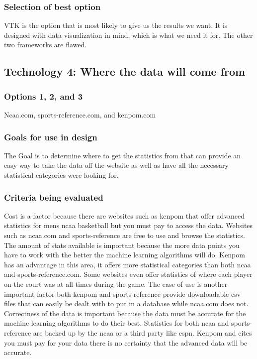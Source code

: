 \documentclass[journal,onecolumn]{IEEEtran}
\begin{document}
\subsubsection{Selection of best option}
VTK is the option that is most likely to give us the results we want. It is designed with data visualization in mind, which is what we need it for. The other two frameworks are flawed.

\subsection{Technology 4: Where the data will come from}

\subsubsection{Options 1, 2, and 3}
Ncaa.com, sports-reference.com, and kenpom.com 
\subsubsection{Goals for use in design}
The Goal is to determine where to get the statistics from that can provide an easy way to take the data off the website as well as have all the necessary statistical categories were looking for.

\subsubsection{Criteria being evaluated}
Cost is a factor because there are websites such as kenpom that offer advanced statistics for mens ncaa basketball but you must pay to access the data. Websites such as ncaa.com and sports-reference are free to use and browse the statistics. The amount of stats available is important because the more data points you have to work with the better the machine learning algorithms will do. Kenpom has an advantage in this area, it offers more statistical categories than both ncaa and sports-reference.com. Some websites even offer statistics of where each player on the court was at all times during the game. The ease of use is another important factor both kenpom and sports-reference provide downloadable csv files that can easily be dealt with to put in a database while ncaa.com does not. Correctness of the data is important because the data must be accurate for the machine learning algorithms to do their best. Statistics for both ncaa and sports-reference are backed up by the ncaa or a third party like espn. Kenpom and cites you must pay for your data there is no certainty that the advanced data will be accurate. 
\end{document}
